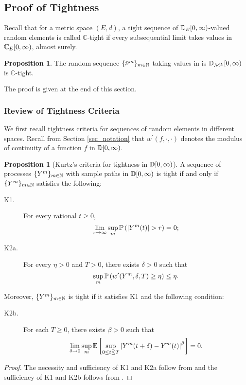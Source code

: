 \documentclass{article}
\theoremstyle{definition}
\newtheorem{proposition}[theorem]{Proposition}
\numberwithin{equation}{section}
\begin{document}
\subsection{Proof of Tightness}\label{sec_tight}

Recall that for a metric space $(E,d)$, a tight sequence of $\mathbb{D}_E[0,\infty)$-valued random elements is called $\mathbb{C}$-tight if every subsequential limit takes values in $\mathbb{C}_E[0,\infty)$, almost surely. 

\begin{proposition}\label{prop_nutight}
  The random sequence $\{\bar{\nu}^m\}_{m\in\mathbb{N}}$ taking values in  is $\mathbb{D}_{\mathcal{M}^L}[0,\infty)$ is  $\mathbb{C}$-tight.
\end{proposition}

The proof is given at the end of this section.

\subsubsection{Review of Tightness Criteria}\label{sec_tightCriteria}

We first recall tightness criteria for sequences of random elements in different spaces. Recall from Section \ref{sec_notation} that $w^\prime(f,\cdot,\cdot)$ denotes the modulus of continuity of a function $f$ in $\mathbb{D}[0,\infty)$.

\begin{proposition}[Kurtz's criteria for tightness in $\mathbb{D}[0,\infty)$]\label{Kurtz}
A sequence of processes $\{Y^m\}_{m\in\mathbb{N}}$ with sample paths in $\mathbb{D}[0,\infty)$ is tight if and only if $\{Y^m\}_{m\in\mathbb{N}}$ satisfies the following:
\begin{description}
\item [K1.] For every rational $t\geq0$,
\begin{equation}
  \lim_{r\to\infty} \sup_{m}\Prob{|Y^m(t)|>r}=0;
\end{equation}
\end{description}
\begin{description}
  \item[K2a.] For every $\eta>0$ and $T>0$, there exists $\delta>0$ such that
  \begin{equation}
    \sup_m\mathbb{P}\left(w^\prime(Y^m,\delta,T)\geq\eta\right)\leq \eta.
  \end{equation}
\end{description}
Moreover, $\{Y^m\}_{m\in\mathbb{N}}$ is tight if it satisfies K1 and the following condition:
\begin{description}
  \item[K2b.] For each $T\geq 0$, there exists $\beta>0$ such that
  \begin{equation}
    \lim_{\delta\to 0}\sup_{m}\mathbb{E}\left[\sup_{0\leq t\leq T}\left|Y^m(t+\delta)-Y^m(t)\right|^\beta\right]=0.
  \end{equation}
\end{description}
\end{proposition}
\begin{proof}
The necessity and sufficiency of K1 and K2a follow from \cite[Theorem 3.7.2]{KurtzBook} and the sufficiency of K1 and K2b follows from \cite[Theorems 3.7.2 and 3.8.6 and Remark 3.8.7]{KurtzBook}.
\end{proof}
\end{document}
